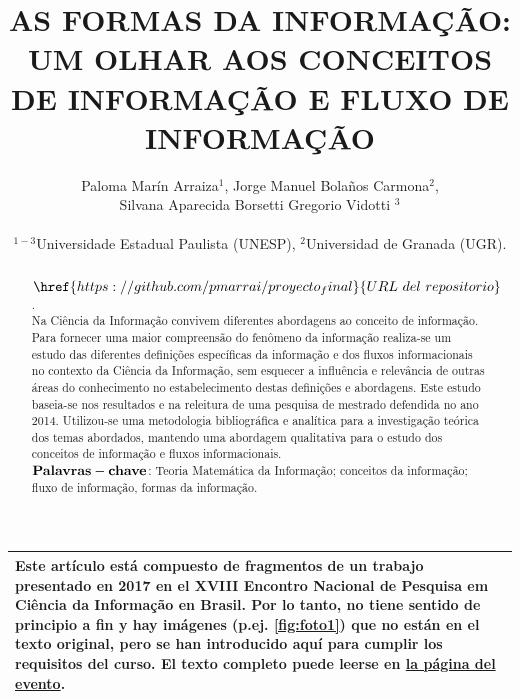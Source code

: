 \documentclass[a4paper,11pt]{article}
\begin{document}
\title{AS FORMAS DA INFORMAÇÃO: UM OLHAR AOS CONCEITOS DE INFORMAÇÃO E FLUXO DE INFORMAÇÃO}
\author{Paloma Marín Arraiza$^{1}$, Jorge Manuel Bolaños Carmona$^{2}$, \\
Silvana Aparecida Borsetti Gregorio Vidotti $^{3}$\\ \\
\small{$^{1-3}$Universidade Estadual Paulista (UNESP), $^{2}$Universidad de Granada (UGR).}\\
}
\date{}
\maketitle
\begin{abstract}
$\href{https://github.com/pmarrai/proyecto_final}{URL \ del \ repositorio}$.\\

Na Ciência da Informação convivem diferentes abordagens ao conceito de informação. Para fornecer uma maior compreensão do fenômeno da informação realiza-se um estudo das diferentes definições específicas da informação e dos fluxos informacionais no contexto da Ciência da Informação, sem esquecer a influência e relevância de outras áreas do conhecimento no estabelecimento destas definições e abordagens. Este estudo baseia-se nos resultados e na releitura de uma pesquisa de mestrado defendida no ano 2014. Utilizou-se uma metodologia bibliográfica e analítica para a investigação teórica dos temas abordados, mantendo uma abordagem qualitativa para o estudo dos conceitos de informação e fluxos informacionais. \\

$\bf{Palavras-chave}$: Teoria Matemática da Informação; conceitos da informação; fluxo de
informação, formas da informação.
\end{abstract}

\begin{table}[hp]
\begin{center}
\begin{tabular}{| m{13cm} |}
\hline
{\color[HTML]{FE0000} Este artículo está compuesto de fragmentos de un trabajo presentado en 2017 en el XVIII Encontro Nacional de Pesquisa em Ciência da Informação en Brasil.
 Por lo tanto, no tiene sentido de principio a fin y hay imágenes (p.ej. \ref{fig:foto1}) que no están en el texto original, pero se han introducido aquí para cumplir los requisitos del curso.
 El texto completo puede leerse en \href{http://enancib.marilia.unesp.br/index.php/xviiienancib/ENANCIB/paper/view/167}{la página del evento}.}\\ \hline
\end{tabular}
\end{center}
\end{table}
\end{document}

